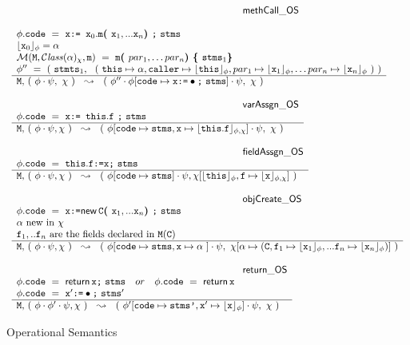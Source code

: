 \begin{figure*}
$\begin{array}{l}
\inferenceruleNN {methCall\_OS} { 
\\
\phi.\prg{code}\ =\ \x {\kw{:= }} \x_0.\m \lp \x_1, ... \x_n \rp \semi \prg{stms}
\\ 
\interp{\x_0}{\phi} = \alpha 
\\
\Meths {} {\ClassOf {\alpha} {\chi}} {\m} \  =  \ \m\lp par_1, \ldots par_n \rp \lb \prg{stms}_1   \rb
  \\
 \phi''\ =\  (\  \prg{stmts}_1,\ \ (\ \this \mapsto \alpha, \caller \mapsto  \interp{\this}{\phi}, par_1 \mapsto  \interp{\x_1}{\phi}, \ldots par_n \mapsto  \interp{\x_n}{\phi}\ ) \ )
}
{
 \M,\, (\ \phi\cdot\psi,\ \chi\ )\ \ \leadsto\  \ (\ \phi''\cdot\phi[\prg{code}\mapsto\x  \kw{:=} \bullet \semi \prg{stms}] \cdot\psi,\ \chi\ ) 
}

\\ \\
\inferenceruleNN {varAssgn\_OS} {
 \phi.\prg{code} \ = \ \x  {\kw{:= }}   \this.\f \ \semi \prg{stms}
}
{
 \M,\,  (\ \phi\cdot\psi, \chi\ )\ \ \leadsto\  \ (\ \phi[ \prg{code} \mapsto \prg{stms}, \x\mapsto \interp{\this.\f}{\phi,\chi}] \cdot\psi,\ \chi\  )
}
\\
\\
\inferenceruleNN{fieldAssgn\_OS} {
 \phi.\prg{code}\ =\  \this.\f  \kw{:=} \x  \semi \prg{stms}
}
{
 \M,\,  (\ \phi\cdot\psi, \chi\  )\ \ \leadsto\  \ (\ \phi[\prg{code}\mapsto  \prg{stms} ] \cdot\psi, \chi[\interp{\this}{\phi},\f \mapsto \interp{\x}{\phi,\chi}]\  ) 
}
\\
\\
\inferenceruleNN {objCreate\_OS} {
 \phi.\prg{code}\ =\  \x  \kw{:=} \kwN{new }\, \c \lp \x_1, ... \x_n \rp  \semi \prg{stms}
 \\
 \alpha\ \mbox{new in}\ \chi
 \\
\f_1, .. \f_n\ \mbox{are the fields declared in } \M(\c)
}
{
 \M,\,  (\ \phi\cdot\psi, \chi\ )\ \ \leadsto\  \ (\ \phi[\prg{code}\mapsto  \prg{stms},\x \mapsto \alpha\ ] \cdot\psi, \ \chi[\alpha \mapsto (\c,\f_1 \mapsto \interp{\x_1}{\phi},  ... \f_n \mapsto \interp{\x_n}{\phi}  ) ]\ ) 
}
\\
\\
\inferenceruleNN {return\_OS} {
 \phi.\prg{code}\ =\   {\kwN{return }}\, \x  \semi \prg{stms}\ \  \ or\  \ \  \phi.\prg{code}\ =\   {\kwN{return}}\, \x 
 \\
\phi.\prg{code}\ =\  \x' \kw{:=} \bullet  \semi \prg{stms}'
}
{
 \M,\,  (\ \phi\cdot\phi'\cdot\psi, \chi\ )\ \ \leadsto\  \ (\ \phi'[\prg{code}\mapsto  \prg{stms'},\x' \mapsto \interp{\x}{\phi}] \cdot\psi, \ \chi \ ) 
}
\end{array}
$
\caption{Operational Semantics}
\label{fig:Execution}
\end{figure*}

